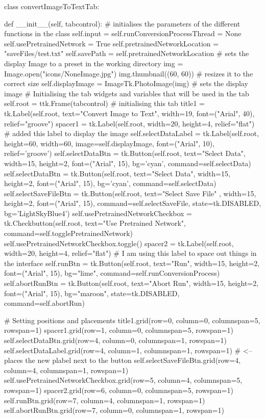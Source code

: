 \documentclass{report}
\begin{document}
\begin{python}
class convertImageToTextTab:

    def __init__(self, tabcontrol):
    	# initialises the parameters of the different functions in the class
    	self.input = self.runConversionProcessThread = None
    	self.usePretrainedNetwork = True
    	self.pretrainedNetworkLocation = "saveFiles/test.txt"
    	self.savePath = self.pretrainedNetworkLocation
    	# sets the display Image to a preset in the working directory
    	img = Image.open("icons/NoneImage.jpg")
    	img.thumbnail((60, 60))  # resizes it to the correct size
    	self.displayImage = ImageTk.PhotoImage(img)  # sets the display image
    	# Initialising the tab widgets and variables that will be used in the tab
    	self.root = ttk.Frame(tabcontrol)  # initialising this tab
    	title1 = tk.Label(self.root, text="Convert Image to Text", width=19,
    						font=("Arial", 40), relief="groove")
    	spacer1 = tk.Label(self.root, width=20, height=4,
    						relief="flat")
    	# added this label to display the image
    	self.selectDataLabel = tk.Label(self.root, height=60, width=60,
    						image=self.displayImage, font=("Arial", 10),
    						relief='groove')
    	self.selectDataBtn = tk.Button(self.root, text="Select Data",
    						width=15, height=2, font=("Arial", 15),
    						bg='cyan', command=self.selectData)
    	self.selectDataBtn = tk.Button(self.root, text="Select Data",
    						width=15, height=2, font=("Arial", 15),
    						bg='cyan', command=self.selectData)
    	self.selectSaveFileBtn = tk.Button(self.root, text="Select Save File"
    							, width=15, height=2, font=("Arial", 15),
    							command=self.selectSaveFile, 
    							state=tk.DISABLED, bg='LightSkyBlue4')
    	self.usePretrainedNetworkCheckbox = tk.Checkbutton(self.root,
    							text="Use Pretrained Network",
    							command=self.togglePretrainedNetwork)
    	self.usePretrainedNetworkCheckbox.toggle()
    	spacer2 = tk.Label(self.root, width=20, height=4,
    					   relief="flat")  # I am using this label to space out things in the interface
    	self.runBtn = tk.Button(self.root, text="Run", width=15, height=2,
    							font=("Arial", 15), bg="lime",
    							command=self.runConversionProcess)
    	self.abortRunBtn = tk.Button(self.root, text="Abort Run", width=15,
    							height=2, font=("Arial", 15),
    							bg="maroon", state=tk.DISABLED,
    							command=self.abortRun)

	# Setting positions and placements
	title1.grid(row=0, column=0, columnspan=5, rowspan=1)
	spacer1.grid(row=1, column=0, columnspan=5, rowspan=1)
	self.selectDataBtn.grid(row=4, column=0, columnspan=1, rowspan=1)
	self.selectDataLabel.grid(row=4, column=1, columnspan=1, rowspan=1)  # <-- places the new plabel next to the button
	self.selectSaveFileBtn.grid(row=4, column=4, columnspan=1, rowspan=1)
	self.usePretrainedNetworkCheckbox.grid(row=5, column=4, columnspan=5, rowspan=1)
	spacer2.grid(row=6, column=0, columnspan=5, rowspan=1)
	self.runBtn.grid(row=7, column=4, columnspan=1, rowspan=1)
	self.abortRunBtn.grid(row=7, column=0, columnspan=1, rowspan=1)


\end{python}
\end{document}
